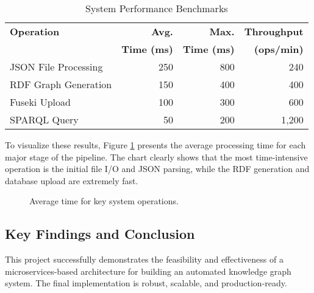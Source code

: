 \documentclass[12pt,a4paper]{article}
\begin{document}
\begin{table}[H]
    \centering
    \caption{System Performance Benchmarks}
    \label{tab:performance}
    \begin{tabular}{@{}lrrr@{}}
        \toprule
        \textbf{Operation} & \textbf{Avg.} & \textbf{Max.} & \textbf{Throughput} \\
         & \textbf{Time (ms)} & \textbf{Time (ms)} & \textbf{(ops/min)} \\
        \midrule
        JSON File Processing & 250 & 800 & 240 \\
        RDF Graph Generation & 150 & 400 & 400 \\
        Fuseki Upload & 100 & 300 & 600 \\
        SPARQL Query & 50 & 200 & 1,200 \\
        \bottomrule
    \end{tabular}
\end{table}

To visualize these results, Figure \ref{fig:perf_chart} presents the average processing time for each major stage of the pipeline. The chart clearly shows that the most time-intensive operation is the initial file I/O and JSON parsing, while the RDF generation and database upload are extremely fast.

\begin{figure}[H]
    \centering
    \caption{Average time for key system operations.}
    \label{fig:perf_chart}
\end{figure}

\subsection{Key Findings and Conclusion}
This project successfully demonstrates the feasibility and effectiveness of a microservices-based architecture for building an automated knowledge graph system. The final implementation is robust, scalable, and production-ready.
\end{document}
